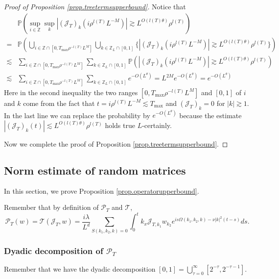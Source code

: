 \begin{proof}[Proof of Proposition \ref{prop.treetermsupperbound}]
Notice that 
\begin{equation}\label{eq.unionbound}
\begin{split}
    &\mathbb{P}\left(\sup_{i\in \mathbb{Z}} \sup_{k} |(\mathcal{J}_{T})_{k}(i\rho^{l(T)}L^{-M})|\gtrsim L^{O(l(T)\theta)} \rho^{l(T)}\right)
    \\
    =&\mathbb{P}\left(\bigcup_{i\in \mathbb{Z}\cap [0, T_{\text{max}}\rho^{-l(T)}L^{M}]}\bigcup_{k\in \mathbb{Z}_{L}\cap [0,1]}\{ |(\mathcal{J}_{T})_{k}(i\rho^{l(T)}L^{-M})|\gtrsim L^{O(l(T)\theta)} \rho^{l(T)}\}\right)
    \\
    \lesssim & \sum_{i\in \mathbb{Z}\cap [0, T_{\text{max}}\rho^{-l(T)}L^{M}]}\sum_{k\in \mathbb{Z}_{L}\cap [0,1]}\mathbb{P}\left( |(\mathcal{J}_{T})_{k}(i\rho^{l(T)}L^{-M})|\gtrsim L^{O(l(T)\theta)} \rho^{l(T)}\right)
    \\
    \lesssim & \sum_{i\in \mathbb{Z}\cap [0, T_{\text{max}}\rho^{-l(T)}L^{M}]}\sum_{k\in \mathbb{Z}_{L}\cap [0,1]} e^{-O(L^{\theta})}= L^{2M}e^{-O(L^{\theta})}=e^{-O(L^{\theta})}
\end{split}
\end{equation}
Here in the second inequality the two ranges $[0, T_{\text{max}}\rho^{-l(T)}L^{M}]$ and $[0,1]$ of $i$ and $k$ come from the fact that $t=i\rho^{l(T)}L^{-M}\lesssim  T_{\text{max}}$ and $(\mathcal{J}_{T})_{k}=0$ for $|k|\gtrsim 1$. In the last line we can replace the probability by $e^{-O(L^{\theta})}$ because the estimate $|(\mathcal{J}_{T})_{k}(t)|\lesssim L^{O(l(T)\theta)} \rho^{l(T)}$ holds true $L$-certainly. 

Now we complete the proof of Proposition \ref{prop.treetermsupperbound}.
\end{proof}


\subsection{Norm estimate of random matrices} \label{sec.randommatrices} In this section, we prove Proposition \ref{prop.operatorupperbound}. 

Remember that by definition of $\mathcal{P}_{T}$ and $\mathcal{T}$, 
\begin{equation}\label{eq.formulaP_T}
\mathcal{P}_{T}(w)=\mathcal{T}(\mathcal{J}_{T},w)=\frac{i\lambda}{L^{d}} \sum\limits_{S(k_1,k_2,k)=0}\int^{t}_0k_{x}\mathcal{J}_{T,k_1} w_{k_2}e^{i s\Omega(k_1,k_2,k)- \nu|k|^2(t-s)} ds.
\end{equation}    

\subsubsection{Dyadic decomposition of $\mathcal{P}_{T}$}
Remember that we have the dyadic decomposition $[0,1]= \bigcup_{\tau=0}^{\infty}[2^{-\tau},2^{-\tau-1}]$.

